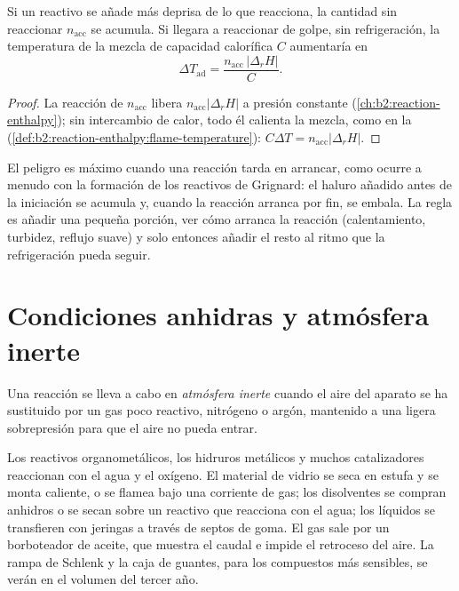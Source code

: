 \begin{proposition}[Acumulación]\label{prop:b2:lab-techniques-2:accumulation}
Si un reactivo se añade más deprisa de lo que reacciona, la cantidad sin reaccionar $n_{\mathrm{acc}}$ se acumula. Si
llegara a reaccionar de golpe, sin refrigeración, la temperatura de la mezcla de capacidad calorífica $C$ aumentaría en
\begin{equation*}
\Delta T_{\mathrm{ad}} = \frac{n_{\mathrm{acc}}\,|\Delta_rH|}{C}.
\end{equation*}
\end{proposition}

\begin{proof}
La reacción de $n_{\mathrm{acc}}$ libera $n_{\mathrm{acc}}|\Delta_rH|$ a presión constante
(\cref{ch:b2:reaction-enthalpy}); sin intercambio de calor, todo él calienta la mezcla, como en la
 (\cref{def:b2:reaction-enthalpy:flame-temperature}): $C\Delta T =
n_{\mathrm{acc}}|\Delta_rH|$.
\end{proof}

El peligro es máximo cuando una reacción tarda en arrancar, como ocurre a menudo con la formación de los reactivos de Grignard: el haluro
añadido antes de la iniciación se acumula y, cuando la reacción arranca por fin, se embala. La regla es añadir una pequeña
porción, ver cómo arranca la reacción (calentamiento, turbidez, reflujo suave) y solo entonces añadir el resto al
ritmo que la refrigeración pueda seguir.

\section{Condiciones anhidras y atmósfera inerte}

\begin{definition}\label{def:b2:lab-techniques-2:inert}
Una reacción se lleva a cabo en \emph{atmósfera inerte} cuando el aire del aparato
se ha sustituido por un gas poco reactivo, nitrógeno o argón, mantenido a una ligera sobrepresión para que el aire
no pueda entrar.
\end{definition}

Los reactivos organometálicos, los hidruros metálicos y muchos catalizadores reaccionan con el agua y el oxígeno. El material de vidrio se
seca en estufa y se monta caliente, o se flamea bajo una corriente de gas; los disolventes se compran anhidros o se secan
sobre un reactivo que reacciona con el agua; los líquidos se transfieren con jeringas a través de septos de goma.
El gas sale por un borboteador de aceite, que muestra el caudal e impide el retroceso del aire. La
rampa de Schlenk y la caja de guantes, para los compuestos más sensibles, se verán en el volumen del tercer año.

